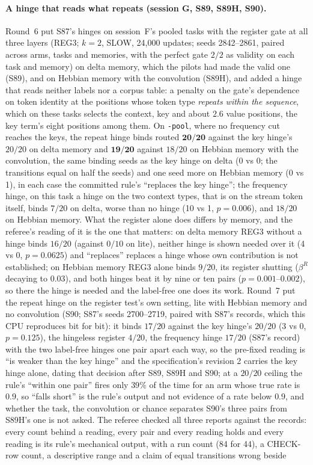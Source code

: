 \documentclass[11pt]{article}
\begin{document}
\paragraph{A hinge that reads what repeats (session G, S89, S89H, S90).} Round~6 put S87's hinges on session~F's pooled tasks with the register gate at all three layers (REG3; $k = 2$, SLOW, 24{,}000 updates; seeds 2842--2861, paired across arms, tasks and memories, with the perfect gate $2/2$ as validity on each task and memory) on delta memory, which the pilots had made the valid one (S89), and on Hebbian memory with the convolution (S89H), and added a hinge that reads neither labels nor a corpus table: a penalty on the gate's dependence on token identity at the positions whose token type \emph{repeats within the sequence}, which on these tasks selects the context, key and about $2.6$ value positions, the key term's eight positions among them. On \texttt{-pool}, where no frequency cut reaches the keys, the repeat hinge binds routed $\mathbf{20/20}$ against the key hinge's $20/20$ on delta memory and $\mathbf{19/20}$ against $18/20$ on Hebbian memory with the convolution, the same binding seeds as the key hinge on delta (0 vs 0; the transitions equal on half the seeds) and one seed more on Hebbian memory (0 vs 1), in each case the committed rule's ``replaces the key hinge''; the frequency hinge, on this task a hinge on the two context types, that is on the stream token itself, binds $7/20$ on delta, worse than no hinge (10 vs 1, $p = 0.006$), and $18/20$ on Hebbian memory. What the register alone does differs by memory, and the referee's reading of it is the one that matters: on delta memory REG3 without a hinge binds $16/20$ (against $0/10$ on lite), neither hinge is shown needed over it (4 vs 0, $p = 0.0625$) and ``replaces'' replaces a hinge whose own contribution is not established; on Hebbian memory REG3 alone binds $9/20$, its register shutting ($\beta^R$ decaying to $0.03$), and both hinges beat it by nine or ten pairs ($p = 0.001$--$0.002$), so there the hinge is needed and the label-free one does its work. Round~7 put the repeat hinge on the register test's own setting, lite with Hebbian memory and no convolution (S90; S87's seeds 2700--2719, paired with S87's records, which this CPU reproduces bit for bit): it binds $17/20$ against the key hinge's $20/20$ (3 vs 0, $p = 0.125$), the hingeless register $4/20$, the frequency hinge $17/20$ (S87's record) with the two label-free hinges one pair apart each way, so the pre-fixed reading is ``is weaker than the key hinge'' and the specification's revision 2 carries the key hinge alone, dating that decision after S89, S89H and S90; at a $20/20$ ceiling the rule's ``within one pair'' fires only $39\%$ of the time for an arm whose true rate is $0.9$, so ``falls short'' is the rule's output and not evidence of a rate below $0.9$, and whether the task, the convolution or chance separates S90's three pairs from S89H's one is not asked. The referee checked all three reports against the records: every count behind a reading, every pair and every reading holds and every reading is its rule's mechanical output, with a run count (84 for 44), a CHECK-row count, a descriptive range and a claim of equal transitions wrong beside 
\end{document}
